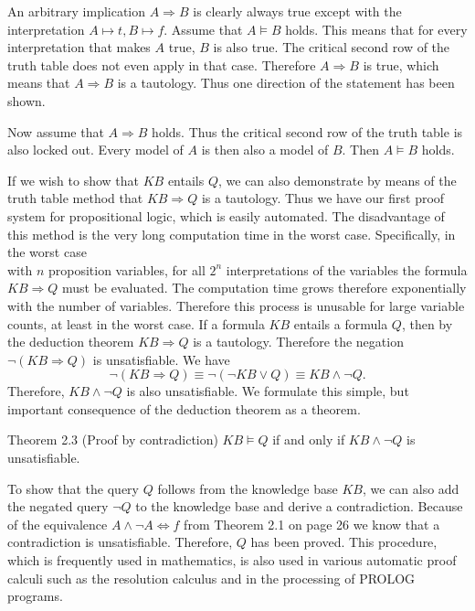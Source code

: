 \documentclass[10pt]{book}
\begin{document}
An arbitrary implication $A \Rightarrow B$ is clearly always true except with the interpretation $A \longmapsto t, B \longmapsto f$. Assume that $A \models B$ holds. This means that for every interpretation that makes $A$ true, $B$ is also true. The critical second row of the truth table does not even apply in that case. Therefore $A \Rightarrow B$ is true, which means that $A \Rightarrow B$ is a tautology. Thus one direction of the statement has been shown.

Now assume that $A \Rightarrow B$ holds. Thus the critical second row of the truth table is also locked out. Every model of $A$ is then also a model of $B$. Then $A \models B$ holds.

If we wish to show that $K B$ entails $Q$, we can also demonstrate by means of the truth table method that $K B \Rightarrow Q$ is a tautology. Thus we have our first proof system for propositional logic, which is easily automated. The disadvantage of this method is the very long computation time in the worst case. Specifically, in the worst case\\
with $n$ proposition variables, for all $2^{n}$ interpretations of the variables the formula $K B \Rightarrow Q$ must be evaluated. The computation time grows therefore exponentially with the number of variables. Therefore this process is unusable for large variable counts, at least in the worst case.
If a formula $KB$ entails a formula $Q$, then by the deduction theorem $KB \Rightarrow Q$ is a tautology. Therefore the negation $\neg(KB \Rightarrow Q)$ is unsatisfiable. We have
$$
\neg(KB \Rightarrow Q) \equiv \neg(\neg KB \vee Q) \equiv KB \wedge \neg Q.
$$
Therefore, $KB \wedge \neg Q$ is also unsatisfiable. We formulate this simple, but important consequence of the deduction theorem as a theorem.

Theorem 2.3 (Proof by contradiction) $KB \models Q$ if and only if $KB \wedge \neg Q$ is unsatisfiable.

To show that the query $Q$ follows from the knowledge base $KB$, we can also add the negated query $\neg Q$ to the knowledge base and derive a contradiction. Because of the equivalence $A \wedge \neg A \Leftrightarrow f$ from Theorem 2.1 on page 26 we know that a contradiction is unsatisfiable. Therefore, $Q$ has been proved. This procedure, which is frequently used in mathematics, is also used in various automatic proof calculi such as the resolution calculus and in the processing of PROLOG programs.
\end{document}
